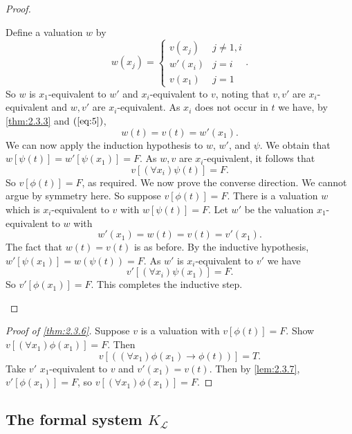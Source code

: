 \documentclass{article}
\renewcommand{\L}{\mathcal{L}}
\newcommand{\rb}[1]{\left( #1 \right)}
\renewcommand{\sb}[1]{\left[ #1 \right]}
\newcommand{\impb}[2]{\rb{#1 \rightarrow #2}}
\newcommand{\fab}[1]{\rb{\forall #1}}
\theoremstyle{definition}\newtheorem{definition}{Definition}[subsection]
\theoremstyle{definition}\newtheorem{remark}[definition]{Remark}
\theoremstyle{definition}\newtheorem*{example}{Example}
\theoremstyle{definition}\newtheorem*{note}{Note}
\begin{document}
\begin{proof}
\begin{enumerate}
Define a valuation $ w $ by
$$ w\rb{x_j} = \begin{cases} v\rb{x_j} & j \ne 1, i \\ w'\rb{x_i} & j = i \\ v\rb{x_1} & j = 1 \end{cases}. $$
So $ w $ is $ x_1 $-equivalent to $ w' $ and $ x_i $-equivalent to $ v $, noting that $ v, v' $ are $ x_i $-equivalent and $ w, v' $ are $ x_i $-equivalent. As $ x_i $ does not occur in $ t $ we have, by \ref{thm:2.3.3} and $ \rb{\ref{eq:5}} $,
$$ w\rb{t} = v\rb{t} = w'\rb{x_1}. $$
We can now apply the induction hypothesis to $ w $, $ w' $, and $ \psi $. We obtain that $ w\sb{\psi\rb{t}} = w'\sb{\psi\rb{x_1}} = F $. As $ w, v $ are $ x_i $-equivalent, it follows that
$$ v\sb{\fab{x_i}\psi\rb{t}} = F. $$
So $ v\sb{\phi\rb{t}} = F $, as required. We now prove the converse direction. We cannot argue by symmetry here. So suppose $ v\sb{\phi\rb{t}} = F $. There is a valuation $ w $ which is $ x_i $-equivalent to $ v $ with $ w\sb{\psi\rb{t}} = F $. Let $ w' $ be the valuation $ x_1 $-equivalent to $ w $ with
$$ w'\rb{x_1} = w\rb{t} = v\rb{t} = v'\rb{x_1}. $$
The fact that $ w\rb{t} = v\rb{t} $ is as before. By the inductive hypothesis, $ w'\sb{\psi\rb{x_1}} = w\rb{\psi\rb{t}} = F $. As $ w' $ is $ x_i $-equivalent to $ v' $ we have
$$ v'\sb{\fab{x_i}\psi\rb{x_1}} = F. $$
So $ v'\sb{\phi\rb{x_1}} = F $. This completes the inductive step.
\end{enumerate}
\end{proof}

\begin{proof}[Proof of \ref{thm:2.3.6}]
Suppose $ v $ is a valuation with $ v\sb{\phi\rb{t}} = F $. Show $ v\sb{\fab{x_1}\phi\rb{x_1}} = F $. Then
$$ v\sb{\impb{\fab{x_1}\phi\rb{x_1}}{\phi\rb{t}}} = T. $$
Take $ v' $ $ x_1 $-equivalent to $ v $ and $ v'\rb{x_1} = v\rb{t} $. Then by \ref{lem:2.3.7}, $ v'\sb{\phi\rb{x_1}} = F $, so $ v\sb{\fab{x_1}\phi\rb{x_1}} = F $.
\end{proof}

\subsection{The formal system $ K_{\L} $}
\end{document}
